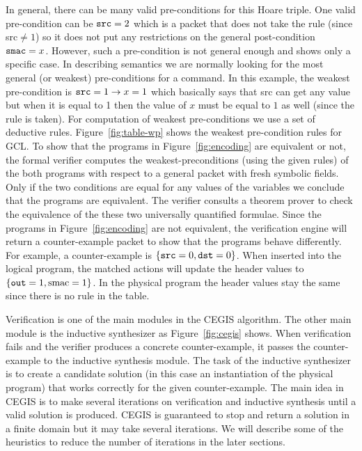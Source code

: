 In general, there can be many valid pre-conditions for this Hoare triple.
One valid pre-condition can be $\mbox{\ttfamily src} = 2$ which is a packet that
does not take the rule (since {\ttfamily src}$\neq1$) 
so it does not put any restrictions on the general post-condition $\mbox{\ttfamily smac} = x$.
However, such a pre-condition is not general enough and shows only a specific case.
In describing semantics we are normally looking for the most general (or weakest)
pre-conditions for a command. 
In this example, the weakest pre-condition is $\mbox{\ttfamily src}=1\rightarrow x = 1$
which basically says that {\ttfamily src} can get any value but when it is equal to 1
then the value of $x$ must be equal to $1$ as well (since the rule is taken).
For computation of weakest pre-conditions we use a set of deductive rules.
Figure~\ref{fig:table-wp} shows the weakest pre-condition rules for GCL.
To show that the programs in Figure~\ref{fig:encoding} are equivalent or not,
the formal verifier computes the weakest-preconditions (using the given rules) 
of the both programs with respect to a general packet with fresh symbolic fields.
Only if the two conditions are equal for any values of the variables we 
conclude that the programs are equivalent.
The verifier consults a theorem prover to check the equivalence of the these two universally quantified formulae.
Since the programs in Figure~\ref{fig:encoding} are not equivalent, 
the verification engine will return a counter-example packet to show that the 
programs behave differently.
For example, a counter-example is $\{\mbox{\ttfamily src}=0,\mbox{\ttfamily dst}=0\}$.
When inserted into the logical program, the matched actions will update the header values to 
$\{\mbox{\ttfamily out}=1,\mbox{smac}=1\}$.
In the physical program the header values stay the same since there is no rule in the table.

Verification is one of the main modules in the CEGIS algorithm.
The other main module is the inductive synthesizer as Figure~\ref{fig:cegis} shows.
When verification fails and the verifier produces a concrete counter-example,
it passes the counter-example to the inductive synthesis module.
The task of the inductive synthesizer is to create a candidate solution 
(in this case an instantiation of the physical program)
that works correctly for the given counter-example.
The main idea in CEGIS is to make several iterations on verification and 
inductive synthesis until a valid solution is produced.
CEGIS is guaranteed to stop and return a solution in a finite domain but 
it may take several iterations.
We will describe some of the heuristics to reduce the number of iterations in the later
sections.

